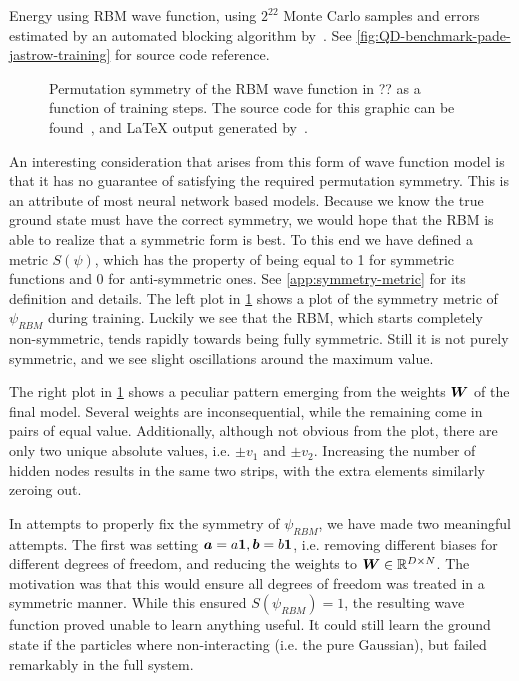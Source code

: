 \documentclass[Thesis.tex]{subfiles}
\begin{document}
\begin{table}[h]
  \centering
  
  \caption{Energy using RBM wave function, using $2^{22}$
    Monte Carlo samples and errors estimated by an automated blocking algorithm
    by~\textcite{Jonsson-2018}. See \cref{fig:QD-benchmark-pade-jastrow-training}
    for source code reference.}
  \label{tab:rbm-energy-results}
\end{table}

\begin{figure}[h]
   \centering
    \resizebox{\linewidth}{!}{%
        
    }
    \caption{\label{fig:QD-rbm-symmetry}Permutation symmetry of the RBM wave
function in ?? as a function of training steps. The source code for this graphic
can be found~\cite[TODO: Add path]{MS-thesis-repository}, and \LaTeX{} output
generated by~\cite{nico_schlomer_2018_1173090}.}
\end{figure}

An interesting consideration that arises from this form of wave function model
is that it has no guarantee of satisfying the required permutation symmetry.
This is an attribute of most neural network based models. Because we know the
true ground state must have the correct symmetry, we would hope that the RBM is
able to realize that a symmetric form is best. To this end we have defined a
metric $S(\psi)$, which has the property of being equal to 1 for symmetric
functions and $0$ for anti-symmetric ones. See \cref{app:symmetry-metric} for
its definition and details. The left plot in \cref{fig:QD-rbm-symmetry} shows a
plot of the symmetry metric of $\psi_{RBM}$ during training. Luckily we see
that the RBM, which starts completely non-symmetric, tends rapidly towards being
fully symmetric. Still it is not purely symmetric, and we see slight
oscillations around the maximum value.

The right plot in \cref{fig:QD-rbm-symmetry} shows a peculiar pattern emerging
from the weights $\bm{W}$ of the final model. Several weights are
inconsequential, while the remaining come in pairs of equal value. Additionally,
although not obvious from the plot, there are only two unique absolute values,
i.e. $\pm v_1$ and $\pm v_2$. Increasing the number of hidden nodes results in
the same two strips, with the extra elements similarly zeroing out. 

In attempts to properly fix the symmetry of $\psi_{RBM}$, we have made two meaningful
attempts. The first was setting $\bm{a} =a \bm{1}, \bm{b} = b\bm{1}$, i.e. removing
different biases for different degrees of freedom, and reducing the weights to
$\bm{W}\in\mathbb{R}^{D\times N}$. The motivation was that this would ensure all
degrees of freedom was treated in a symmetric manner. While this ensured
$S(\psi_{RBM})=1$, the resulting wave function proved unable to learn anything
useful. It could still learn the ground state if the particles where
non-interacting (i.e. the pure Gaussian), but failed remarkably in the full
system.
\end{document}

